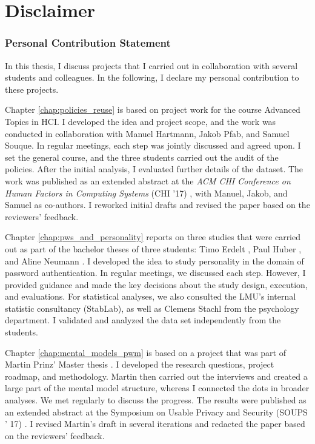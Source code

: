 
\section*{Disclaimer}

\subsubsection{Personal Contribution Statement}
In this thesis, I discuss projects that I carried out in collaboration with several students and colleagues. In the following, I declare my personal contribution to these projects. 

Chapter \ref{chap:policies_reuse} is based on project work for the course Advanced Topics in HCI. I developed the idea and project scope, and the work was conducted in collaboration with Manuel Hartmann, Jakob Pfab, and Samuel Souque. In regular meetings, each step was jointly discussed and agreed upon. I set the general course, and the three students carried out the audit of the policies. After the initial analysis, I evaluated further details of the dataset. The work was published as an extended abstract at the \textit{ACM CHI Conference on Human Factors in Computing Systems} (CHI '17) \cite{Seitz2017PoliciesReuse}, with Manuel, Jakob, and Samuel as co-authors. I reworked initial drafts and revised the paper based on the reviewers' feedback. 

Chapter \ref{chap:pws_and_personality} reports on three studies that were carried out as part of the bachelor theses of three students: Timo Erdelt \cite{Erdelt2017BA}, Paul Huber \cite{Huber2016BA}, and Aline Neumann \cite{Neumann2017BA}. I developed the idea to study personality in the domain of password authentication. In regular meetings, we discussed each step. However, I provided guidance and made the key decisions about the study design, execution, and evaluations. For statistical analyses, we also consulted the LMU's internal statistic consultancy (StabLab), as well as Clemens Stachl from the psychology department. I validated and analyzed the data set independently from the students.

Chapter \ref{chap:mental_models_pwm} is based on a project that was part of Martin Prinz' Master thesis \cite{Prinz2017Thesis}. I developed the research questions, project roadmap, and methodology. Martin then carried out the interviews and created a large part of the mental model structure, whereas I connected the dots in broader analyses. We met regularly to discuss the progress. The results were published as an extended abstract at the Symposium on Usable Privacy and Security (SOUPS ' 17) \cite{Prinz2017MentalModel}. I revised Martin's draft in several iterations and redacted the paper based on the reviewers' feedback. 

